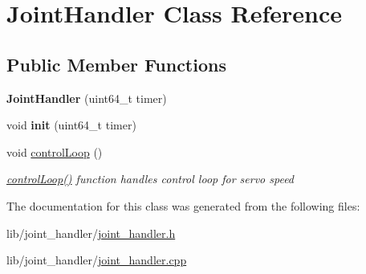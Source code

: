 \hypertarget{classJointHandler}{}\section{Joint\+Handler Class Reference}
\label{classJointHandler}
\subsection*{Public Member Functions}
\begin{DoxyCompactItemize}
\item 
{\bfseries Joint\+Handler} (uint64\+\_\+t timer)\hypertarget{classJointHandler_ab7a86a3c24b204f1f8d702836b2bf379}{}\label{classJointHandler_ab7a86a3c24b204f1f8d702836b2bf379}

\item 
void {\bfseries init} (uint64\+\_\+t timer)\hypertarget{classJointHandler_a76f031836e4d7e04b1d438ef89e4f0eb}{}\label{classJointHandler_a76f031836e4d7e04b1d438ef89e4f0eb}

\item 
void \hyperlink{classJointHandler_a1f890b1331990499e0c7b5a9fb3040cf}{control\+Loop} ()\hypertarget{classJointHandler_a1f890b1331990499e0c7b5a9fb3040cf}{}\label{classJointHandler_a1f890b1331990499e0c7b5a9fb3040cf}

\begin{DoxyCompactList}\small\item\em \hyperlink{classJointHandler_a1f890b1331990499e0c7b5a9fb3040cf}{control\+Loop()} function handles control loop for servo speed \end{DoxyCompactList}\end{DoxyCompactItemize}


The documentation for this class was generated from the following files\+:\begin{DoxyCompactItemize}
\item 
lib/joint\+\_\+handler/\hyperlink{joint__handler_8h}{joint\+\_\+handler.\+h}\item 
lib/joint\+\_\+handler/\hyperlink{joint__handler_8cpp}{joint\+\_\+handler.\+cpp}\end{DoxyCompactItemize}
